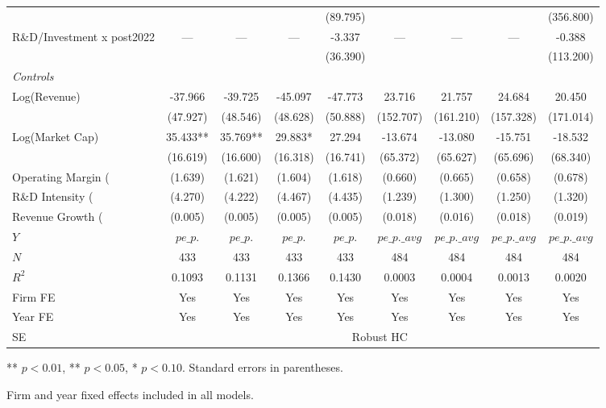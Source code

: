 \begin{table}[htbp]
\begin{tabular}{lcccc|cccc}
  &  &  &  & (89.795) &  &  &  & (356.800) \\
\quad R\&D/Investment x post2022 & --- & --- & --- & -3.337 & --- & --- & --- & -0.388 \\
  &  &  &  & (36.390) &  &  &  & (113.200) \\
\multicolumn{9}{l}{\textit{Controls}}\\
\quad Log(Revenue) & -37.966 & -39.725 & -45.097 & -47.773 & 23.716 & 21.757 & 24.684 & 20.450 \\
  & (47.927) & (48.546) & (48.628) & (50.888) & (152.707) & (161.210) & (157.328) & (171.014) \\
\quad Log(Market Cap) & 35.433** & 35.769** & 29.883* & 27.294 & -13.674 & -13.080 & -15.751 & -18.532 \\
  & (16.619) & (16.600) & (16.318) & (16.741) & (65.372) & (65.627) & (65.696) & (68.340) \\
\quad Operating Margin (%
  & (1.639) & (1.621) & (1.604) & (1.618) & (0.660) & (0.665) & (0.658) & (0.678) \\
\quad R\&D Intensity (%
  & (4.270) & (4.222) & (4.467) & (4.435) & (1.239) & (1.300) & (1.250) & (1.320) \\
\quad Revenue Growth (%
  & (0.005) & (0.005) & (0.005) & (0.005) & (0.018) & (0.016) & (0.018) & (0.019) \\
\hline
$Y$ & $pe\_p.$ & $pe\_p.$ & $pe\_p.$ & $pe\_p.$ & $pe\_p.\_avg$ & $pe\_p.\_avg$ & $pe\_p.\_avg$ & $pe\_p.\_avg$ \\
$N$ & 433 & 433 & 433 & 433 & 484 & 484 & 484 & 484 \\
$R^2$ & 0.1093 & 0.1131 & 0.1366 & 0.1430 & 0.0003 & 0.0004 & 0.0013 & 0.0020 \\
Firm FE & Yes & Yes & Yes & Yes & Yes & Yes & Yes & Yes \\
Year FE & Yes & Yes & Yes & Yes & Yes & Yes & Yes & Yes \\
SE & \multicolumn{8}{c}{Robust HC} \\
\hline\hline
\end{tabular}
\begin{tablenotes}\small
\item *** $p<0.01$, ** $p<0.05$, * $p<0.10$. Standard errors in parentheses.
\item Firm and year fixed effects included in all models.
\end{tablenotes}
\end{table}
